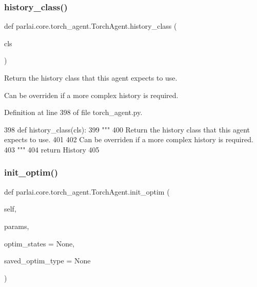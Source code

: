 \subsubsection{\texorpdfstring{history\+\_\+class()}{history\_class()}}
{\footnotesize\ttfamily def parlai.\+core.\+torch\+\_\+agent.\+Torch\+Agent.\+history\+\_\+class (\begin{DoxyParamCaption}\item[{}]{cls }\end{DoxyParamCaption})}

\begin{DoxyVerb}Return the history class that this agent expects to use.

Can be overriden if a more complex history is required.
\end{DoxyVerb}
 

Definition at line 398 of file torch\+\_\+agent.\+py.


\begin{DoxyCode}
398     \textcolor{keyword}{def }history\_class(cls):
399         \textcolor{stringliteral}{"""}
400 \textcolor{stringliteral}{        Return the history class that this agent expects to use.}
401 \textcolor{stringliteral}{}
402 \textcolor{stringliteral}{        Can be overriden if a more complex history is required.}
403 \textcolor{stringliteral}{        """}
404         \textcolor{keywordflow}{return} History
405 
\end{DoxyCode}
\mbox{\label{classparlai_1_1core_1_1torch__agent_1_1TorchAgent_a3784f1ddaa6ffad009716910f3f36dd4}} 
\subsubsection{\texorpdfstring{init\+\_\+optim()}{init\_optim()}}
{\footnotesize\ttfamily def parlai.\+core.\+torch\+\_\+agent.\+Torch\+Agent.\+init\+\_\+optim (\begin{DoxyParamCaption}\item[{}]{self,  }\item[{}]{params,  }\item[{}]{optim\+\_\+states = {\ttfamily None},  }\item[{}]{saved\+\_\+optim\+\_\+type = {\ttfamily None} }\end{DoxyParamCaption})}

